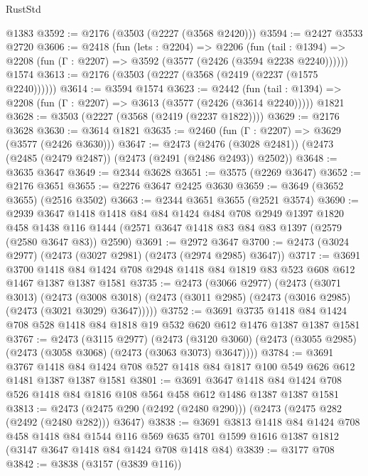 \begin{lexlean}{RustStd}
\begin{coremodule}
    @1383
@3592 := @2176 (@3503 (@2227 (@3568 @2420)))
@3594 := @2427 @3533 @2720
@3606 := @2418
    (fun (lets : @2204) =>
    @2206
      (fun (tail : @1394) => @2208 (fun (Γ : @2207) => @3592 (@3577 (@2426 (@3594 @2238 @2240))))))
    @1574
@3613 := @2176 (@3503 (@2227 (@3568 (@2419 (@2237 (@1575 @2240))))))
@3614 := @3594 @1574
@3623 := @2442
    (fun (tail : @1394) => @2208 (fun (Γ : @2207) => @3613 (@3577 (@2426 (@3614 @2240)))))
    @1821
@3628 := @3503 (@2227 (@3568 (@2419 (@2237 @1822))))
@3629 := @2176 @3628
@3630 := @3614 @1821
@3635 := @2460 (fun (Γ : @2207) => @3629 (@3577 (@2426 @3630)))
@3647 := @2473
    (@2476 (@3028 @2481))
    (@2473 (@2485 (@2479 @2487)) (@2473 (@2491 (@2486 @2493)) @2502))
@3648 := @3635 @3647
@3649 := @2344 @3628
@3651 := @3575 (@2269 @3647)
@3652 := @2176 @3651
@3655 := @2276 @3647 @2425 @3630
@3659 := @3649 (@3652 @3655) (@2516 @3502)
@3663 := @2344 @3651 @3655 (@2521 @3574)
@3690 := @2939
    @3647
    @1418
    @1418
    @84
    @84
    @1424
    @484
    @708
    @2949
    @1397
    @1820
    @458
    @1438
    @116
    @1444
    (@2571 @3647 @1418 @83 @84 @83 @1397 (@2579 (@2580 @3647 @83)) @2590)
@3691 := @2972 @3647
@3700 := @2473 (@3024 @2977) (@2473 (@3027 @2981) (@2473 (@2974 @2985) @3647))
@3717 := @3691
    @3700
    @1418
    @84
    @1424
    @708
    @2948
    @1418
    @84
    @1819
    @83
    @523
    @608
    @612
    @1467
    @1387
    @1387
    @1581
@3735 := @2473
    (@3066 @2977)
    (@2473
      (@3071 @3013)
      (@2473 (@3008 @3018) (@2473 (@3011 @2985) (@2473 (@3016 @2985) (@2473 (@3021 @3029) @3647)))))
@3752 := @3691
    @3735
    @1418
    @84
    @1424
    @708
    @528
    @1418
    @84
    @1818
    @19
    @532
    @620
    @612
    @1476
    @1387
    @1387
    @1581
@3767 := @2473
    (@3115 @2977)
    (@2473 (@3120 @3060) (@2473 (@3055 @2985) (@2473 (@3058 @3068) (@2473 (@3063 @3073) @3647))))
@3784 := @3691
    @3767
    @1418
    @84
    @1424
    @708
    @527
    @1418
    @84
    @1817
    @100
    @549
    @626
    @612
    @1481
    @1387
    @1387
    @1581
@3801 := @3691
    @3647
    @1418
    @84
    @1424
    @708
    @526
    @1418
    @84
    @1816
    @108
    @564
    @458
    @612
    @1486
    @1387
    @1387
    @1581
@3813 := @2473 (@2475 @290 (@2492 (@2480 @290))) (@2473 (@2475 @282 (@2492 (@2480 @282))) @3647)
@3838 := @3691
    @3813
    @1418
    @84
    @1424
    @708
    @458
    @1418
    @84
    @1544
    @116
    @569
    @635
    @701
    @1599
    @1616
    @1387
    @1812
    (@3147 @3647 @1418 @84 @1424 @708 @1418 @84)
@3839 := @3177 @708
@3842 := @3838 (@3157 (@3839 @116))

\end{coremodule}
\end{lexlean}
